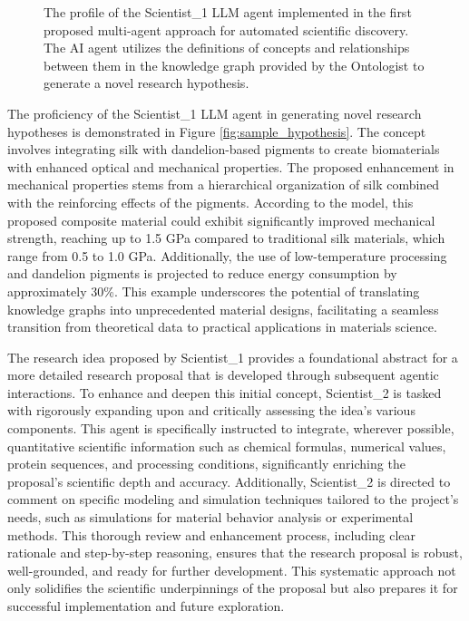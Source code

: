 \documentclass{article}
\begin{document}
\begin{figure}[ht!]
\begin{Box1}[colbacktitle={white!90!white}, colback={black!3!white}]{}
\end{Box1}
    \caption{The profile of the Scientist\_1 LLM agent implemented in the first proposed multi-agent approach for automated scientific discovery. The AI agent utilizes the definitions of concepts and relationships
between them in the knowledge graph provided by the Ontologist to generate a novel research hypothesis.}
    \label{fig:scientist1}
\end{figure}

The proficiency of the Scientist\_1 LLM agent in generating novel research hypotheses is demonstrated in Figure \ref{fig:sample_hypothesis}. The concept involves integrating silk with dandelion-based pigments to create biomaterials with enhanced optical and mechanical properties. The proposed enhancement in mechanical properties stems from a hierarchical organization of silk combined with the reinforcing effects of the pigments. According to the model, this proposed composite material could exhibit significantly improved mechanical strength, reaching up to 1.5 GPa compared to traditional silk materials, which range from 0.5 to 1.0 GPa. Additionally, the use of low-temperature processing and dandelion pigments is projected to reduce energy consumption by approximately 30\%. This example underscores the potential of translating knowledge graphs into unprecedented material designs, facilitating a seamless transition from theoretical data to practical applications in materials science. 

The research idea proposed by Scientist\_1 provides a foundational abstract for a more detailed research proposal that is developed through subsequent agentic interactions. To enhance and deepen this initial concept, Scientist\_2 is tasked with rigorously expanding upon and critically assessing the idea's various components. This agent is specifically instructed to integrate, wherever possible, quantitative scientific information such as chemical formulas, numerical values, protein sequences, and processing conditions, significantly enriching the proposal's scientific depth and accuracy. Additionally, Scientist\_2 is directed to comment on specific modeling and simulation techniques tailored to the project's needs, such as simulations for material behavior analysis or experimental methods. This thorough review and enhancement process, including clear rationale and step-by-step reasoning, ensures that the research proposal is robust, well-grounded, and ready for further development. This systematic approach not only solidifies the scientific underpinnings of the proposal but also prepares it for successful implementation and future exploration.
\end{document}
